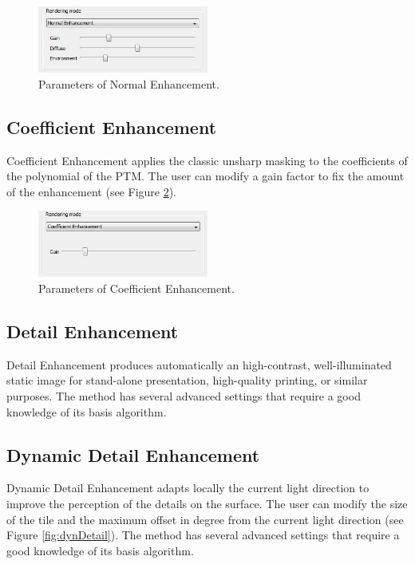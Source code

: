 \documentclass[oneside, 11pt]{book}
\begin{document}
\begin{figure}[hbt]
  \centering
  \includegraphics[width=0.5\textwidth]{normal_enh}
  \caption{Parameters of Normal Enhancement.}
  \label{fig:normalEnh}
\end{figure}

\subsection{Coefficient Enhancement}
Coefficient Enhancement applies the classic unsharp masking to the coefficients of the polynomial of the PTM. The user can modify a gain factor to fix the amount of the enhancement (see Figure \ref{fig:coeffEnh}).

\begin{figure}[hbt]
  \centering
  \includegraphics[width=0.5\textwidth]{coeff_enh}
  \caption{Parameters of Coefficient Enhancement.}
  \label{fig:coeffEnh}
\end{figure}

\subsection{Detail Enhancement}
Detail Enhancement produces automatically an high-contrast, well-illuminated static image for stand-alone presentation, high-quality printing, or similar purposes. The method has several advanced settings that require a good knowledge of its basis algorithm.

\subsection{Dynamic Detail Enhancement}
Dynamic Detail Enhancement adapts locally the current light direction to improve the perception of the details on the surface. The user can modify the size of the tile and the maximum offset in degree from the current light direction (see Figure \ref{fig:dynDetail}). The method has several advanced settings that require a good knowledge of its basis algorithm.
\end{document}
